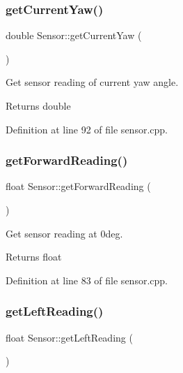 \subsubsection{\texorpdfstring{get\+Current\+Yaw()}{getCurrentYaw()}}
{\footnotesize\ttfamily double Sensor\+::get\+Current\+Yaw (\begin{DoxyParamCaption}{ }\end{DoxyParamCaption})}



Get sensor reading of current yaw angle. 

\begin{DoxyReturn}{Returns}
double 
\end{DoxyReturn}


Definition at line 92 of file sensor.\+cpp.

\mbox{\label{class_sensor_a0cb8d226a7df00fa404c100f959868e6}} 
\subsubsection{\texorpdfstring{get\+Forward\+Reading()}{getForwardReading()}}
{\footnotesize\ttfamily float Sensor\+::get\+Forward\+Reading (\begin{DoxyParamCaption}{ }\end{DoxyParamCaption})}



Get sensor reading at 0deg. 

\begin{DoxyReturn}{Returns}
float 
\end{DoxyReturn}


Definition at line 83 of file sensor.\+cpp.

\mbox{\label{class_sensor_a68826b1eb0dcda3a0508f213a42db25b}} 
\subsubsection{\texorpdfstring{get\+Left\+Reading()}{getLeftReading()}}
{\footnotesize\ttfamily float Sensor\+::get\+Left\+Reading (\begin{DoxyParamCaption}{ }\end{DoxyParamCaption})}



